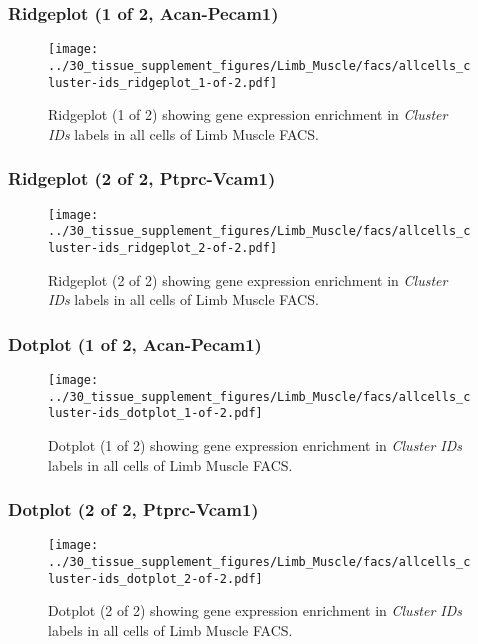 \clearpage

\subsubsection{Ridgeplot (1 of 2, Acan-Pecam1)}
\begin{figure}[h]
\centering
\texttt{[image: ../30\_tissue\_supplement\_figures/Limb\_Muscle/facs/allcells\_cluster-ids\_ridgeplot\_1-of-2.pdf]}

\caption{ Ridgeplot (1 of 2)  showing gene expression enrichment in \emph{Cluster IDs} labels in all cells of Limb Muscle FACS. }
\end{figure}


\clearpage

\subsubsection{Ridgeplot (2 of 2, Ptprc-Vcam1)}
\begin{figure}[h]
\centering
\texttt{[image: ../30\_tissue\_supplement\_figures/Limb\_Muscle/facs/allcells\_cluster-ids\_ridgeplot\_2-of-2.pdf]}

\caption{ Ridgeplot (2 of 2)  showing gene expression enrichment in \emph{Cluster IDs} labels in all cells of Limb Muscle FACS. }
\end{figure}


\clearpage

\subsubsection{Dotplot (1 of 2, Acan-Pecam1)}
\begin{figure}[h]
\centering
\texttt{[image: ../30\_tissue\_supplement\_figures/Limb\_Muscle/facs/allcells\_cluster-ids\_dotplot\_1-of-2.pdf]}

\caption{ Dotplot (1 of 2)  showing gene expression enrichment in \emph{Cluster IDs} labels in all cells of Limb Muscle FACS. }
\end{figure}


\clearpage

\subsubsection{Dotplot (2 of 2, Ptprc-Vcam1)}
\begin{figure}[h]
\centering
\texttt{[image: ../30\_tissue\_supplement\_figures/Limb\_Muscle/facs/allcells\_cluster-ids\_dotplot\_2-of-2.pdf]}

\caption{ Dotplot (2 of 2)  showing gene expression enrichment in \emph{Cluster IDs} labels in all cells of Limb Muscle FACS. }
\end{figure}


